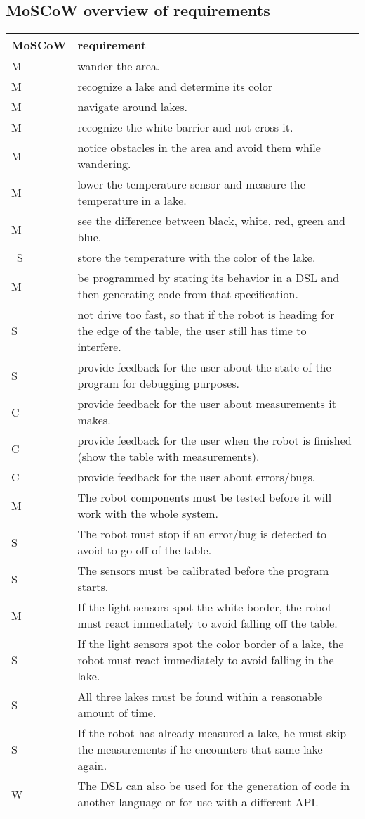 \documentclass[10pt,a4paper]{article}
\begin{document}
\subsection*{MoSCoW overview of requirements}
\begin{tabular}{|p{3cm}|p{12cm}|} 
\hline
MoSCoW & requirement\\
\hline
M & wander the area.\\
M & recognize a lake and determine its color\\
M & navigate around lakes.\\
M & recognize the white barrier and not cross it.\\
M & notice obstacles in the area and avoid them while wandering.\\
M & lower the temperature sensor and measure the temperature in a lake.\\
M & see the difference between black, white, red, green and blue.\\\
S & store the temperature with the color of the lake.\\
\hline
M & be programmed by stating its behavior in a DSL and then generating code from that specification.\\
S & not drive too fast, so that if the robot is heading for the edge of the table, the user still has time to interfere.\\
S & provide feedback for the user about the state of the program for debugging purposes.\\
C & provide feedback for the user about measurements it makes.\\
C & provide feedback for the user when the robot is finished (show the table with measurements).\\
C & provide feedback for the user about errors/bugs.\\
\hline
M & The robot components must be tested before it will work with the whole system.\\
S & The robot must stop if an error/bug is detected to avoid to go off of the table. \\
S & The sensors must be calibrated before the program starts.\\
\hline
M & If the light sensors spot the white border, the robot must react immediately to avoid falling off the table.\\
S & If the light sensors spot the color border of a lake, the robot must react immediately to avoid falling in the lake.\\
S & All three lakes must be found within a reasonable amount of time.\\
S & If the robot has already measured a lake, he must skip the measurements if he encounters that same lake again.\\
\hline
W & The DSL can also be used for the generation of code in another language or for use with a different API.\\
\hline
\end{tabular}
\end{document}
